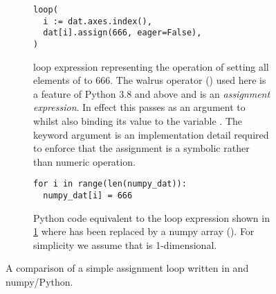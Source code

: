 \documentclass[thesis]{subfiles}
\begin{document}
\begin{figure}[h]
  \centering

  \begin{subfigure}[t]{.48\textwidth}
    \centering
    \begin{verbatim}
loop(
  i := dat.axes.index(),
  dat[i].assign(666, eager=False),
)
    \end{verbatim}
    \caption{
       loop expression representing the operation of setting all elements of  to 666.
      The walrus operator (\pycode{:=}) used here is a feature of Python 3.8 and above and is an \textit{assignment expression}.
      In effect this passes  as an argument to  whilst also binding its value to the variable .
      The keyword argument  is an implementation detail required to enforce that the assignment is a symbolic rather than numeric operation.
    }
    \label{fig:simple_loop_pyop3}
  \end{subfigure}
  \hfill
  \begin{subfigure}[t]{.48\textwidth}
    \centering
    \begin{verbatim}
for i in range(len(numpy_dat)):
  numpy_dat[i] = 666

    \end{verbatim}
    \caption{
      Python code equivalent to the loop expression shown in \ref{fig:simple_loop_pyop3} where  has been replaced by a numpy array ().
      For simplicity we assume that  is 1-dimensional.
    }
    \label{fig:simple_loop_python}
  \end{subfigure}

  \caption{A comparison of a simple assignment loop written in  and numpy/Python.}
  \label{fig:simple_loop}
\end{figure}
\end{document}
